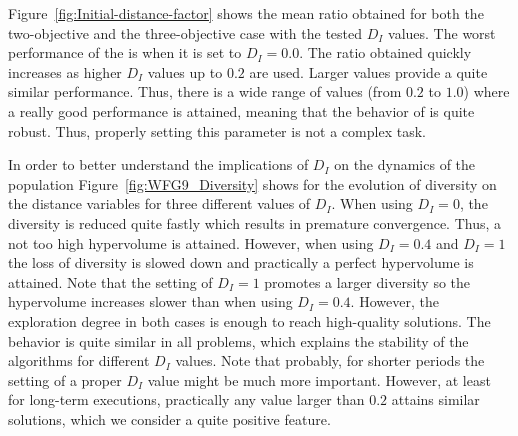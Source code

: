 Figure~\ref{fig:Initial-distance-factor} shows the mean \HV{} ratio obtained for both the two-objective 
and the three-objective case with the tested $D_I$ values.
%
The worst performance of the \AVSDMOEAD{} is when it is set to $D_I=0.0$.
%
The \HV{} ratio obtained quickly increases as higher $D_I$ values up to $0.2$ are used.
%
Larger values provide a quite similar performance.
%
Thus, there is a wide range of values (from $0.2$ to $1.0$) where a really good performance is attained, 
meaning that the behavior of \AVSDMOEAD{} is quite robust.
%
Thus, properly setting this parameter is not a complex task.

In order to better understand the implications of $D_I$ on the dynamics of the population Figure~\ref{fig:WFG9_Diversity}
shows for \AVSDMOEAD{} the evolution of diversity on the distance variables for three different values of $D_I$.
%
When using $D_I = 0$, the diversity is reduced quite fastly which results in premature convergence.
%
Thus, a not too high hypervolume is attained.
%
However, when using $D_I = 0.4$ and $D_I = 1$ the loss of diversity is slowed down and practically a perfect hypervolume
is attained.
%
Note that the setting of $D_I = 1$ promotes a larger diversity so the hypervolume increases slower than when using
$D_I = 0.4$.
%
However, the exploration degree in both cases is enough to reach high-quality solutions.
%
The behavior is quite similar in all problems, which explains the stability of the algorithms for
different $D_I$ values.
%
Note that probably, for shorter periods the setting of a proper $D_I$ value might be much more important.
%
However, at least for long-term executions, practically any value larger than $0.2$ attains similar solutions,
which we consider a quite positive feature.


%
%
%
%
%
%
%
%
%


